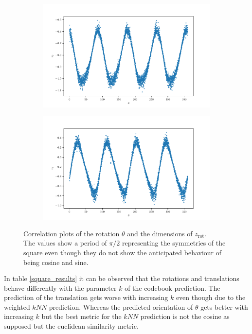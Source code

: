 \documentclass[10pt,a4paper]{article}
\newcommand{\rot}{\ensuremath{\text{rot}\xspace}}
\begin{document}
\begin{figure}[!ht]
\centering
\begin{subfigure}{0.49\textwidth}
	\centering
	\includegraphics[width=\textwidth] {square_theta_z0.pdf}
	\caption{}
	\label{fig_zo}
\end{subfigure}
\begin{subfigure}{0.49\textwidth}
	\centering	
	\includegraphics[width=\textwidth]{square_theta_z1.pdf}
	\caption{}
	\label{fig_z1}
\end{subfigure}
\caption{Correlation plots of the rotation $\theta$ and the dimensions of $z_{\rot}$.\\
The values show a period of $\pi/2$ representing the symmetries of the square even though they do not show the anticipated behaviour of being cosine and sine.} \label{Square_corr_rot}
\end{figure}
In table \ref{square_results} it can be observed that the rotations and translations behave differently with the parameter $k$ of the codebook prediction. The prediction of the translation gets worse with increasing $k$ even though due to the weighted $kNN$ prediction. Whereas the predicted orientation of $\theta$ gets better with increasing $k$ but the best metric for the $kNN$ prediction is not the cosine as supposed but the euclidean similarity metric.
\end{document}
